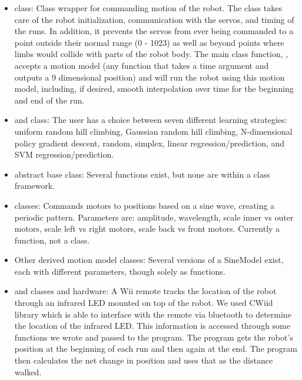 \begin{itemize}
\item {} class: Class wrapper for commanding
  motion of the robot.  The  class takes care of the robot
  initialization, communication with the servos, and timing of the
  runs.  In addition, it prevents the servos from ever being commanded
  to a point outside their normal range (0 - 1023) as well as beyond
  points where limbs would collide with parts of the robot body.  The
  main class function, , accepts a motion model (any
  function that takes a time argument and outputs a 9 dimensional
  position) and will run the robot using this motion model, including,
  if desired, smooth interpolation over time for the beginning and end
  of the run.

\item {} and  class: The user has a choice between seven
  different learning strategies: uniform random hill climbing, Gaussian random
  hill climbing, N-dimensional policy gradient descent, random, 
  simplex, linear regression/prediction, and SVM regression/prediction.

\item {} abstract base class: Several functions exist, but none are within a class framework.

\item {} classes: Commands motors to positions
  based on a sine wave, creating a periodic pattern. Parameters are:
  amplitude, wavelength, scale inner vs outer motors, scale left vs right
  motors, scale back vs front motors. Currently a function, not a class.

\item Other derived motion model classes: Several versions of a SineModel
  exist, each with different parameters, though solely as functions.

\item {} and  classes
 and hardware: A Wii remote tracks the location of the robot through an infrared LED mounted on top of the robot. We used CWiid library which is able to interface with the remote via bluetooth to determine the location of the infrared LED. This information is accessed through some functions we wrote and passed to the program. The program gets the robot's position at the beginning of each run and then again at the end. The program then calculates the net change in position and uses that as the distance walked.

\end{itemize}

